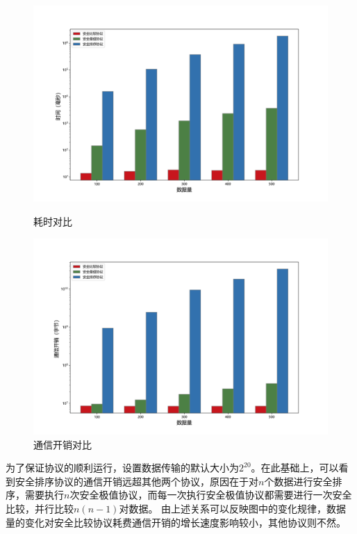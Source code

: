 \begin{figure}[htbp] %
	\begin{minipage}[t]{0.5\linewidth}
		\includegraphics[width=\linewidth]{img/timecompare.png}
		\caption{耗时对比}
		\label{s4-exp-tcost}
	\end{minipage}%
	\hfill%
	\begin{minipage}[t]{0.5\linewidth}
		\includegraphics[width=\linewidth]{img/commcompare.png}
		\caption{通信开销对比}
		\label{s4-exp-ccost}
	\end{minipage}
\end{figure}\textbf{}

为了保证协议的顺利运行，设置数据传输的默认大小为$ 2^{20} $。在此基础上，可以看到安全排序协议的通信开销远超其他两个协议，原因在于对$ n $个数据进行安全排序，需要执行$ n $次安全极值协议，而每一次执行安全极值协议都需要进行一次安全比较，并行比较$ n(n-1) $对数据。
由上述关系可以反映图中的变化规律，数据量的变化对安全比较协议耗费通信开销的增长速度影响较小，其他协议则不然。


